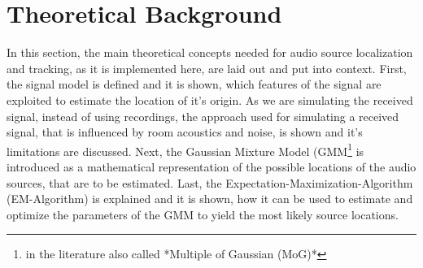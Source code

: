 \chapter{Theoretical Background}
\label{chap:theory}
In this section, the main theoretical concepts needed for audio source localization and tracking, as it is implemented here, are laid out and put into context. First, the signal model is defined and it is shown, which features of the signal are exploited to estimate the location of it's origin. As we are simulating the received signal, instead of using recordings, the approach used for simulating a received signal, that is influenced by room acoustics and noise, is shown and it's limitations are discussed. Next, the Gaussian Mixture Model (GMM\footnote{in the literature also called *Multiple of Gaussian (MoG)*} is introduced as a mathematical representation of the possible locations of the audio sources, that are to be estimated. Last, the Expectation-Maximization-Algorithm (EM-Algorithm) is explained and it is shown, how it can be used to estimate and optimize the parameters of the GMM to yield the most likely source locations.